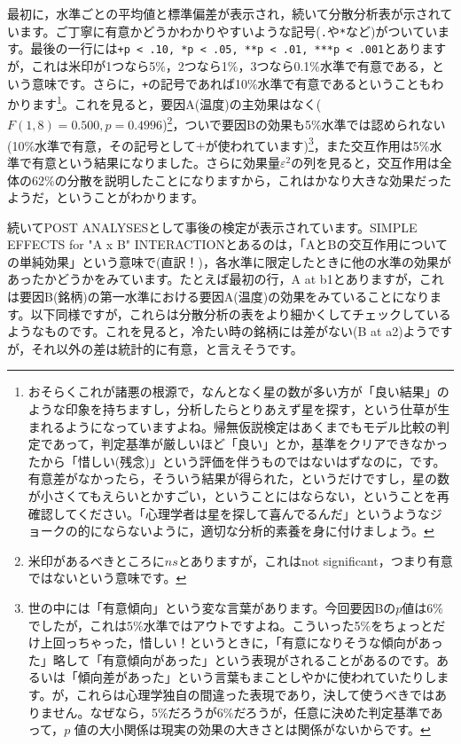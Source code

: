 \documentclass{ltjbook}
\begin{document}
最初に，水準ごとの平均値と標準偏差が表示され，続いて分散分析表が示されています。ご丁寧に有意かどうかわかりやすいような記号(\verb|.|や\verb|*|など)がついています。最後の一行には\texttt{+p < .10, *p < .05, **p < .01, ***p < .001}とありますが，これは米印が1つなら5\%，2つなら1\%，3つなら0.1\%水準で有意である，という意味です。さらに，\verb|+|の記号であれば10\%水準で有意であるということもわかります\footnote{おそらくこれが諸悪の根源で，なんとなく星の数が多い方が「良い結果」のような印象を持ちますし，分析したらとりあえず星を探す，という仕草が生まれるようになっていますよね。帰無仮説検定はあくまでもモデル比較の判定であって，判定基準が厳しいほど「良い」とか，基準をクリアできなかったから「惜しい(残念)」という評価を伴うものではないはずなのに，です。有意差がなかったら，そういう結果が得られた，というだけですし，星の数が小さくてもえらいとかすごい，ということにはならない，ということを再確認してください。「心理学者は星を探して喜んでるんだ」というようなジョークの的にならないように，適切な分析的素養を身に付けましょう。}。これを見ると，要因A(温度)の主効果はなく($F(1,8)=0.500,p=0.4996$)\footnote{米印があるべきところに$ns$とありますが，これはnot significant，つまり有意ではないという意味です。}，ついで要因Bの効果も5\%水準では認められない(10\%水準で有意，その記号として$+$が使われています)\footnote{世の中には「有意傾向」という変な言葉があります。今回要因Bの$p$値は6\%でしたが，これは5\%水準ではアウトですよね。こういった5\%をちょっとだけ上回っちゃった，惜しい！というときに，「有意になりそうな傾向があった」略して「有意傾向があった」という表現がされることがあるのです。あるいは「傾向差があった」という言葉もまことしやかに使われていたりします。が，これらは心理学独自の間違った表現であり，決して使うべきではありません。なぜなら，5\%だろうが6\%だろうが，任意に決めた判定基準であって，$p$ 値の大小関係は現実の効果の大きさとは関係がないからです。}，また交互作用は5\%水準で有意という結果になりました。さらに効果量$\varepsilon^2$の列を見ると，交互作用は全体の62\%の分散を説明したことになりますから，これはかなり大きな効果だったようだ，ということがわかります。

続いてPOST ANALYSESとして事後の検定が表示されています。SIMPLE EFFECTS for "A x B" INTERACTIONとあるのは，「AとBの交互作用についての単純効果」という意味で(直訳！)，各水準に限定したときに他の水準の効果があったかどうかをみています。たとえば最初の行，A at b1とありますが，これは要因B(銘柄)の第一水準における要因A(温度)の効果をみていることになります。以下同様ですが，これらは分散分析の表をより細かくしてチェックしているようなものです。これを見ると，冷たい時の銘柄には差がない(B at a2)ようですが，それ以外の差は統計的に有意，と言えそうです。
\end{document}
